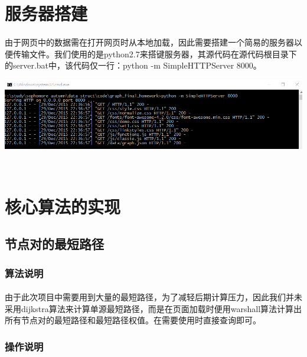 \documentclass{article}
\begin{document}
\begin{CJK}{UTF8}{gkai}
\section{服务器搭建} %
	\paragraph{}
	由于网页中的数据需在打开网页时从本地加载，因此需要搭建一个简易的服务器以便传输文件。我们使用的是python2.7来搭键服务器，其源代码在源代码根目录下的server.bat中，该代码仅一行：python -m SimpleHTTPServer 8000。
	\\[\intextsep] 
	\begin{minipage}{\textwidth} 
	    \centering 
	    \includegraphics[width=0.9\linewidth]{server.PNG}
	\end{minipage} 
	\\[\intextsep] 

\section{核心算法的实现} %
	\subsection{节点对的最短路径}
		\subsubsection{算法说明} %
			\paragraph{}
			由于此次项目中需要用到大量的最短路径，为了减轻后期计算压力，因此我们并未采用dijkstra算法来计算单源最短路径，而是在页面加载时便用warshall算法计算出所有节点对的最短路径和最短路径权值。在需要使用时直接查询即可。
		\subsubsection{操作说明}

\end{CJK}
\end{document}
